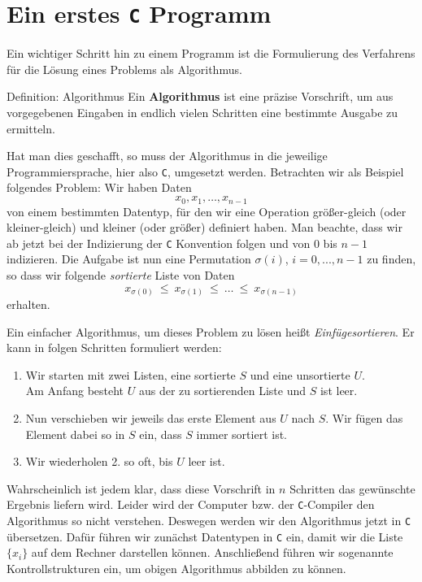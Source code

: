 \section{Ein erstes \texttt{C} Programm}

Ein wichtiger Schritt hin zu einem Programm ist die Formulierung des Verfahrens für die Lösung eines Problems als Algorithmus.
\begin{mydefinitionblock}{Definition: Algorithmus}
Ein \textbf{Algorithmus} ist eine präzise Vorschrift, um aus vorgegebenen
Eingaben in endlich vielen Schritten eine bestimmte Ausgabe zu
ermitteln.
\end{mydefinitionblock}
Hat man dies geschafft, so muss der Algorithmus in die jeweilige Programmiersprache, hier also \texttt{C}, umgesetzt werden.
Betrachten wir als Beispiel folgendes Problem:
Wir haben Daten
\[
x_0, x_1,\ldots,x_{n-1}
\]
von einem bestimmten Datentyp, für den wir eine Operation größer-gleich (oder kleiner-gleich) und kleiner (oder größer) definiert haben.
Man beachte, dass wir ab jetzt bei der Indizierung der \texttt{C} Konvention folgen und von $0$ bis $n-1$ indizieren.
Die Aufgabe ist nun eine Permutation $\sigma(i)$, $i=0,...,n-1$ zu finden, so dass wir folgende \emph{sortierte} Liste von Daten
\[
x_{\sigma(0)}\ \leq\ x_{\sigma(1)}\ \leq\ \ldots\ \leq\ x_{\sigma(n-1)}
\]
erhalten.

Ein einfacher Algorithmus, um dieses Problem zu lösen heißt \emph{Einfügesortieren}.
Er kann in folgen Schritten formuliert werden:
\begin{enumerate}
\item Wir starten mit zwei Listen, eine sortierte $S$ und eine unsortierte $U$.\\
  Am Anfang besteht $U$ aus der zu sortierenden Liste und $S$ ist leer.
\item Nun verschieben wir jeweils das erste Element aus $U$ nach $S$.
  Wir fügen das Element dabei so in $S$ ein, dass $S$ immer sortiert ist.
 \item Wir wiederholen 2. so oft, bis $U$ leer ist.
\end{enumerate}
Wahrscheinlich ist jedem klar, dass diese Vorschrift in $n$ Schritten das gewünschte Ergebnis liefern wird.
Leider wird der Computer bzw. der \texttt{C}-Compiler den Algorithmus so nicht verstehen.
Deswegen werden wir den Algorithmus jetzt in \texttt{C} übersetzen.
Dafür führen wir zunächst Datentypen in \texttt{C} ein, damit wir die Liste $\{x_i\}$ auf dem Rechner darstellen können. 
Anschließend führen wir sogenannte Kontrollstrukturen ein, um obigen Algorithmus abbilden zu können.

